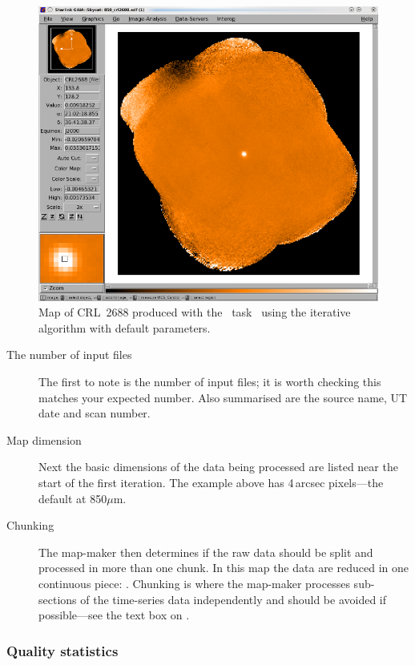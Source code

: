 \begin{figure}
\begin{center}
\includegraphics[width=0.7\linewidth]{sc21_crl2688}
\caption[CRL~2688 produced with \makemap]{
  Map of CRL~2688 produced with the \smurf\ task \makemap\ using the
  iterative algorithm with default parameters. \label{fig:itermap}}
\end{center}
\end{figure}

\begin{description}
\item[The number of input files] The first to note is the number of
  input files; it is worth checking this matches your expected
  number. Also summarised are the source name, UT date and scan
  number.

\item[Map dimension] Next the basic dimensions of the data being
  processed are listed near the start of the first iteration. The
  example above has 4\,arcsec pixels---the default at 850$\mu$m.


\item[Chunking] The map-maker then determines if the raw data should
  be split and processed in more than one chunk. In this map the data
  are reduced in one continuous piece: . Chunking is where the map-maker processes sub-sections of the
  time-series data independently and should be avoided if
  possible---see the text box on .
\end{description}


\subsubsection*{Quality statistics}


